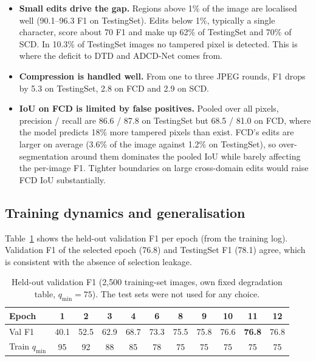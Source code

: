 \documentclass[11pt,a4paper]{article}
\newcommand{\best}[1]{\textbf{#1}}
\begin{document}
\begin{itemize}
  \item \textbf{Small edits drive the gap.} Regions above 1\% of the image are localised well
        (90.1--96.3 F1 on TestingSet). Edits below 1\%, typically a single character, score
        about 70 F1 and make up 62\% of TestingSet and 70\% of SCD. In 10.3\% of TestingSet
        images no tampered pixel is detected. This is where the deficit to DTD and ADCD-Net
        comes from.
  \item \textbf{Compression is handled well.} From one to three JPEG rounds, F1 drops by 5.3 on
        TestingSet, 2.8 on FCD and 2.9 on SCD.
  \item \textbf{IoU on FCD is limited by false positives.} Pooled over all pixels, precision /
        recall are 86.6 / 87.8 on TestingSet but 68.5 / 81.0 on FCD, where the model predicts
        18\% more tampered pixels than exist. FCD's edits are larger on average (3.6\% of the
        image against 1.2\% on TestingSet), so over-segmentation around them dominates the
        pooled IoU while barely affecting the per-image F1. Tighter boundaries on large
        cross-domain edits would raise FCD IoU substantially.
\end{itemize}

\subsection{Training dynamics and generalisation}
Table~\ref{tab:val} shows the held-out validation F1 per epoch (from the training log). Validation
F1 of the selected epoch (76.8) and TestingSet F1 (78.1) agree, which is consistent with the
absence of selection leakage.

\begin{table}[!htbp]
\centering
\caption{Held-out validation F1 (2{,}500 training-set images, own fixed degradation table,
$q_{\min}=75$). The test sets were not used for any choice.}
\label{tab:val}
\begin{tabular}{@{}lcccccccccc@{}}
\toprule
Epoch & 1 & 2 & 3 & 4 & 6 & 8 & 9 & 10 & \textbf{11} & 12 \\
\midrule
Val F1 & 40.1 & 52.5 & 62.9 & 68.7 & 73.3 & 75.5 & 75.8 & 76.6 & \best{76.8} & 76.8 \\
Train $q_{\min}$ & 95 & 92 & 88 & 85 & 78 & 75 & 75 & 75 & 75 & 75 \\
\bottomrule
\end{tabular}
\end{table}
\end{document}
